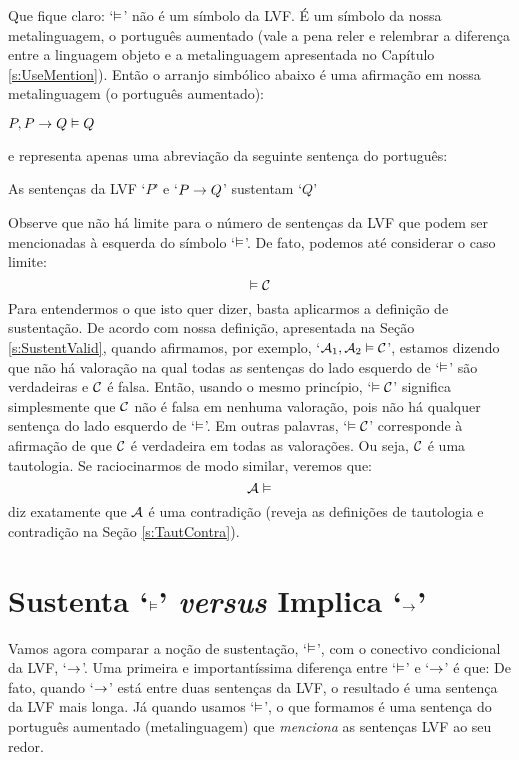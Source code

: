 Que fique claro: `$\vDash$' não é um símbolo da LVF.
É um símbolo da nossa metalinguagem, o português aumentado (vale a pena reler e relembrar a diferença entre a linguagem objeto e a metalinguagem apresentada no Capítulo  \ref{s:UseMention}).
Então o arranjo simbólico abaixo é uma afirmação em nossa metalinguagem (o português aumentado):
	\begin{ebullet}
		\item $P, P \rightarrow Q \vDash Q$
	\end{ebullet}
e representa apenas uma abreviação da seguinte sentença do português:
	\begin{ebullet}
		\item As sentenças da LVF `$P$' e `$P \rightarrow Q$' sustentam `$Q$'
	\end{ebullet}
Observe que não há limite para o número de sentenças da LVF que podem ser mencionadas à esquerda do símbolo `$\vDash$'.
De fato, podemos até considerar o caso limite:
	$$\vDash \mathcal{C}$$
Para entendermos o que isto quer dizer, basta aplicarmos a definição de sustentação.
De acordo com nossa definição, apresentada na Seção \ref{s:SustentValid}, quando afirmamos, por exemplo, `$\mathcal{A}_1, \mathcal{A}_2 \vDash \mathcal{C}$', estamos dizendo que não há valoração na qual todas as sentenças do lado esquerdo de `$\vDash$' são verdadeiras e $\mathcal{C}$ é falsa.
Então, usando o mesmo princípio, `$\vDash \mathcal{C}$' significa simplesmente que $\mathcal{C}$ não é falsa em nenhuma valoração, pois não há qualquer sentença do lado  esquerdo de `$\vDash$'.
Em outras palavras, `$\vDash \mathcal{C}$' corresponde à afirmação de que $\mathcal{C}$ é verdadeira em todas as valorações.
Ou seja,  $\mathcal{C}$ é uma tautologia.
Se raciocinarmos de modo similar, veremos que:
	$$\mathcal{A} \vDash$$
diz exatamente que $\mathcal{A}$ é uma contradição (reveja as definições de tautologia e contradição na Seção \ref{s:TautContra}).


\section[Sustenta \emph{versus} implica]{Sustenta `$\vDash$' \emph{versus} Implica `$\rightarrow$'}\label{s:SustVsCond}
Vamos agora comparar a noção de sustentação, `$\vDash$', com o conectivo condicional da LVF, `$\rightarrow$'.
Uma primeira e importantíssima diferença entre `$\vDash$' e `$\rightarrow$' é que:
{\small
	}
De fato, quando `$\rightarrow$' está entre duas sentenças da LVF, o resultado é uma sentença da LVF mais longa.
Já quando usamos `$\vDash$', o que formamos é uma sentença do português aumentado (metalinguagem) que \emph{menciona} as sentenças LVF ao seu redor.

